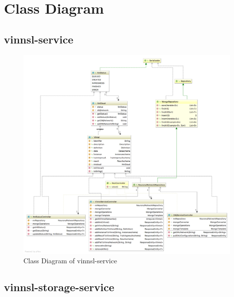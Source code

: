 \subsubsection{}\label{section}

\section{Class Diagram}\label{class-diagram}

\subsection{vinnsl-service}\label{vinnsl-service-1}

\begin{figure}
\centering
\includegraphics[width=17.00000cm]{images/uml-class-diagram-vinnsl-service}
\caption{Class Diagram of vinnsl-service}
\end{figure}

\subsection{vinnsl-storage-service}\label{vinnsl-storage-service}

